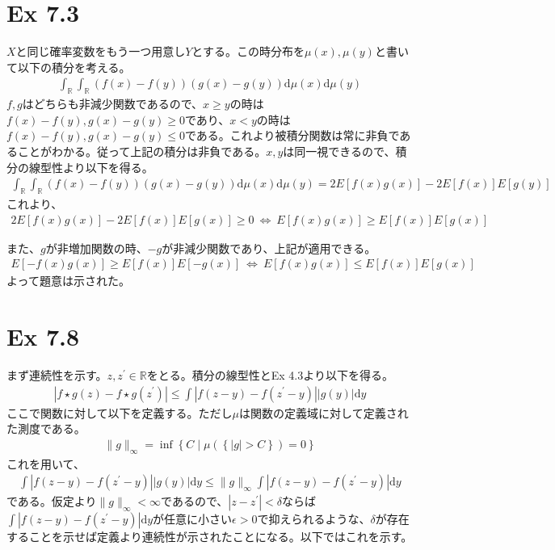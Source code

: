 \documentclass{article}
\begin{document}
\section{Ex 7.3}
$X$と同じ確率変数をもう一つ用意し$Y$とする。この時分布を$\mu(x),\mu(y)$と書いて以下の積分を考える。
\begin{align*}
	\int_{\mathbb{R}}\int_{\mathbb{R}} \left( f(x) - f(y) \right)  \left( g(x) - g(y)\right) \mathrm{d}\mu(x) \mathrm{d}\mu(y)
\end{align*}
$f,g$はどちらも非減少関数であるので、$x \geq y$の時は$f(x) - f(y), g(x) - g(y) \geq 0$であり、$x < y$の時は$f(x) - f(y), g(x) - g(y) \leq 0$である。これより被積分関数は常に非負であることがわかる。従って上記の積分は非負である。$x,y$は同一視できるので、積分の線型性より以下を得る。
\begin{align*}
	\int_{\mathbb{R}}\int_{\mathbb{R}} \left( f(x) - f(y) \right)  \left( g(x) - g(y)\right) \mathrm{d}\mu(x) \mathrm{d}\mu(y) = 2 E \left[ f(x)g(x) \right] - 2E\left[ f(x) \right] E\left[ g(y) \right]
\end{align*}
これより、
\begin{align*}
	2 E \left[ f(x)g(x) \right] - 2E\left[ f(x) \right] E\left[ g(x) \right] \geq 0\ \Leftrightarrow\ E \left[ f(x)g(x) \right] \geq E\left[ f(x) \right] E\left[ g(x) \right]
\end{align*}

また、$g$が非増加関数の時、$-g$が非減少関数であり、上記が適用できる。
\begin{align*}
	E \left[ -f(x)g(x) \right] \geq E\left[ f(x) \right] E\left[ -g(x) \right] \ \Leftrightarrow\ E \left[ f(x)g(x) \right] \leq E\left[ f(x) \right] E\left[ g(x) \right]
\end{align*}
よって題意は示された。

\section{Ex 7.8}
まず連続性を示す。$z, z^{\prime} \in \mathbb{R}$をとる。積分の線型性とEx 4.3より以下を得る。
\begin{align*}
	\left| f\star g(z) - f\star g(z^{\prime}) \right| \leq \int \left| f(z-y) - f(z^{\prime} -y) \right| \left| g(y) \right| \mathrm{d}y
\end{align*}
ここで関数に対して以下を定義する。ただし$\mu$は関数の定義域に対して定義された測度である。
\begin{align*}
	\| g \|_{\infty}  = \inf \left\{ C \mid \mu\left( \left\{ \left| g \right| > C \right\} \right) = 0 \right\}
\end{align*}
これを用いて、
\begin{align*}
	\int \left| f(z-y) - f(z^{\prime} -y) \right| \left| g(y) \right| \mathrm{d}y \leq \| g \|_{\infty} \int \left| f(z-y) - f(z^{\prime} -y) \right| \mathrm{d}y
\end{align*}
である。仮定より$\| g \|_{\infty} < \infty$であるので、$\left| z-z^{\prime} \right| < \delta$ならば$\int \left| f(z-y) - f(z^{\prime} -y) \right| \mathrm{d}y$が任意に小さい$\epsilon > 0$で抑えられるような、$\delta$が存在することを示せば定義より連続性が示されたことになる。以下ではこれを示す。
\end{document}
